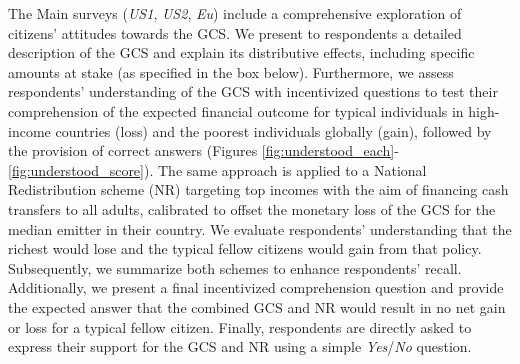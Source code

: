 The Main surveys (\textit{US1}, \textit{US2}, \textit{Eu}) include a comprehensive exploration of citizens' attitudes towards the GCS. We present to respondents a detailed description of the GCS and explain its distributive effects, including specific amounts at stake (as specified in the box below). Furthermore, we assess respondents' understanding of the GCS with incentivized questions to test their comprehension of the expected financial outcome for typical individuals in high-income countries (loss) and the poorest individuals globally (gain), followed by the provision of correct answers (Figures \ref{fig:understood_each}-\ref{fig:understood_score}). %
The same approach is applied to a National Redistribution scheme (NR) targeting top incomes %
with the aim of financing cash transfers to all adults, %
calibrated to offset the monetary loss of the GCS for the median emitter in their country. We evaluate respondents' understanding that the richest would lose and the typical fellow citizens would gain from that policy. %
Subsequently, we summarize both schemes to enhance respondents' recall. Additionally, we present a final incentivized comprehension question and provide the expected answer that the combined GCS and NR would result in no net gain or loss for a typical fellow citizen. Finally, respondents are directly asked to express their support for the GCS and NR using a simple \textit{Yes}/\textit{No} question.

